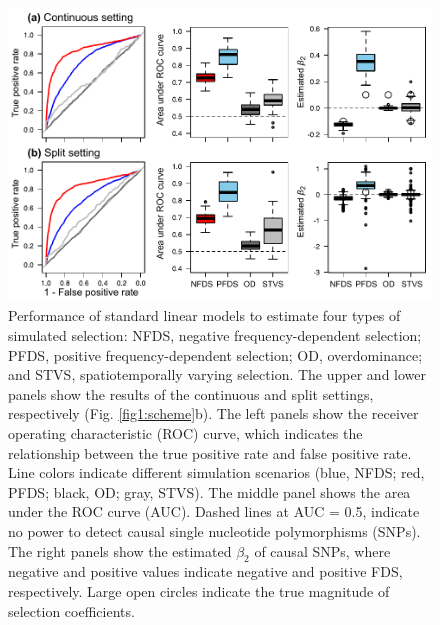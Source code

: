 \documentclass[12pt,]{article}
\begin{document}
\begin{figure}[]
  \includegraphics[width=\linewidth]{beta2LMdomi.pdf}
  \caption{Performance of standard linear models to estimate four types of simulated selection: NFDS, negative frequency-dependent selection; PFDS, positive frequency-dependent selection; OD, overdominance; and STVS, spatiotemporally varying selection. The upper and lower panels show the results of the continuous and split settings, respectively (Fig. \ref{fig1:scheme}b). The left panels show the receiver operating characteristic (ROC) curve, which indicates the relationship between the true positive rate and false positive rate. Line colors indicate different simulation scenarios (blue, NFDS; red, PFDS; black, OD; gray, STVS). The middle panel shows the area under the ROC curve (AUC). Dashed lines at AUC = 0.5, indicate no power to detect causal single nucleotide polymorphisms (SNPs). The right panels show the estimated $\beta_2$ of causal SNPs, where negative and positive values indicate negative and positive FDS, respectively. Large open circles indicate the true magnitude of selection coefficients.}
  \label{figS5:beta2LM}
\end{figure}
\end{document}

